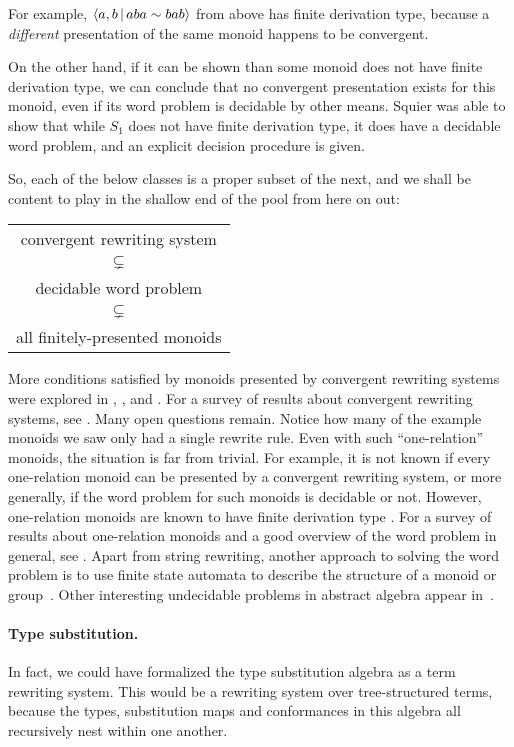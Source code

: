 \documentclass[../generics]{subfiles}
\begin{document}
For example, $\langle a,b\,|\,aba\sim bab\rangle$ from above has finite derivation type, because a \emph{different} presentation of the same monoid happens to be convergent.

On the other hand, if it can be shown than some monoid does not have finite derivation type, we can conclude that no convergent presentation exists for this monoid, even if its word problem is decidable by other means. Squier was able to show that while $S_1$ does not have finite derivation type, it does have a decidable word problem, and an explicit decision procedure is given.

So, each of the below classes is a proper subset of the next, and we shall be content to play in the shallow end of the pool from here on out:
\begin{center}
\begin{tabular}{c}
convergent rewriting system \\
$\subsetneq$ \\
decidable word problem \\
$\subsetneq$ \\
all finitely-presented monoids
\end{tabular}
\end{center}
More conditions satisfied by monoids presented by convergent rewriting systems were explored in \cite{fptype}, \cite{fdtfp3}, and \cite{mild}. For a survey of results about convergent rewriting systems, see \cite{Otto1997}. Many open questions remain. Notice how many of the example monoids we saw only had a single rewrite rule. Even with such ``one-relation'' monoids, the situation is far from trivial. For example, it is not known if every one-relation monoid can be presented by a convergent rewriting system, or more generally, if the word problem for such monoids is decidable or not. However, one-relation monoids are known to have finite derivation type \cite{KOBAYASHI2000547}. For a survey of results about one-relation monoids and a good overview of the word problem in general, see \cite{onerelation}. Apart from string rewriting, another approach to solving the word problem is to use finite state automata to describe the structure of a monoid or group~\cite{epstein1992word}. Other interesting undecidable problems in abstract algebra appear in~\cite{tarski1953undecidable}.

\paragraph{Type substitution.} In fact, we could have formalized the type substitution algebra as a term rewriting system. This would be a rewriting system over tree-structured terms, because the types, substitution maps and conformances in this algebra all recursively nest within one another.
\end{document}

